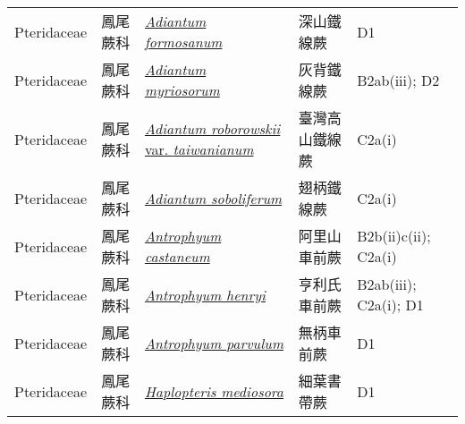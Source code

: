 {\begin{longtable}{L{2.5cm}L{2cm}L{5cm}L{2.5cm}L{3cm}}
    Pteridaceae & 鳳尾蕨科 & \href{http://www.theplantlist.org/tpl1.1/search?q=Adiantum+formosanum}{\textit{Adiantum formosanum} } & 深山鐵線蕨 & D1    \\
    Pteridaceae & 鳳尾蕨科 & \href{http://www.theplantlist.org/tpl1.1/search?q=Adiantum+myriosorum}{\textit{Adiantum myriosorum} } & 灰背鐵線蕨 & B2ab(iii); D2    \\
    Pteridaceae & 鳳尾蕨科 & \href{http://www.theplantlist.org/tpl1.1/search?q=Adiantum+roborowskii+var.+taiwanianum}{\textit{Adiantum roborowskii} var. \textit{taiwanianum} } & 臺灣高山鐵線蕨 & C2a(i)    \\
    Pteridaceae & 鳳尾蕨科 & \href{http://www.theplantlist.org/tpl1.1/search?q=Adiantum+soboliferum}{\textit{Adiantum soboliferum} } & 翅柄鐵線蕨 & C2a(i)    \\
    Pteridaceae & 鳳尾蕨科 & \href{http://www.theplantlist.org/tpl1.1/search?q=Antrophyum+castaneum}{\textit{Antrophyum castaneum} } & 阿里山車前蕨 & B2b(ii)c(ii); C2a(i)    \\
    Pteridaceae & 鳳尾蕨科 & \href{http://www.theplantlist.org/tpl1.1/search?q=Antrophyum+henryi}{\textit{Antrophyum henryi} } & 亨利氏車前蕨 & B2ab(iii); C2a(i); D1    \\
    Pteridaceae & 鳳尾蕨科 & \href{http://www.theplantlist.org/tpl1.1/search?q=Antrophyum+parvulum}{\textit{Antrophyum parvulum} } & 無柄車前蕨 & D1    \\
    Pteridaceae & 鳳尾蕨科 & \href{http://www.theplantlist.org/tpl1.1/search?q=Haplopteris+mediosora}{\textit{Haplopteris mediosora} } & 細葉書帶蕨 & D1    \\

\end{longtable}}
